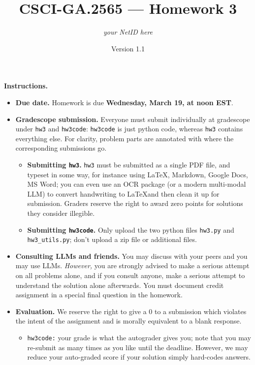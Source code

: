 \documentclass{article}
\title{CSCI-GA.2565 --- Homework 3}
\author{\emph{your NetID here}}
\date{Version 1.1}
\theoremstyle{definition}
\theoremstyle{remark}
\begin{document}
\maketitle

\noindent\textbf{Instructions.}
  \begin{itemize}
    \item
      \textbf{Due date.}
      Homework is due \textbf{Wednesday, March 19, at noon EST}.

    \item
      \textbf{Gradescope submission.}
      Everyone must submit individually at gradescope under \texttt{hw3} and \texttt{hw3code}:
      \texttt{hw3code} is just python code, whereas \texttt{hw3} contains everything else.
      For clarity, problem parts are annotated with where the corresponding submissions go.


      \begin{itemize}
        \item
          \textbf{Submitting \texttt{hw3}.}
          \texttt{hw3} must be submitted as a single PDF file, and typeset in some way,
          for instance using \LaTeX, Markdown, Google Docs, MS Word; you can even use an OCR
          package (or a modern multi-modal LLM) to convert handwriting to \LaTeX and then clean
          it up for submission.  Graders reserve the right to award zero points for
          solutions they consider illegible.

        \item
          \textbf{Submitting \texttt{hw3code}.}
          Only upload the two python files \texttt{hw3.py} and \texttt{hw3\_utils.py};
          don't upload a zip file or additional files.

      \end{itemize}

    \item
      \textbf{Consulting LLMs and friends.}
      You may discuss with your peers and you may use LLMs.  \emph{However,} you are strongly
      advised to make a serious attempt on all problems alone, and if you consult anyone,
      make a serious attempt to understand the solution alone afterwards.
      You must document credit assignment in a special final question in the homework.

    \item
      \textbf{Evaluation.}
      We reserve the right to give a 0 to a submission which violates the intent of the assignment
      and is morally equivalent to a blank response.
      \begin{itemize}
        \item
          \texttt{hw3code:} your grade is what the autograder gives you;
          note that you may re-submit as many times as you like until the deadline.
          However, we may reduce your auto-graded score if your solution simply hard-codes answers.


\end{itemize}
\end{itemize}
\end{document}
